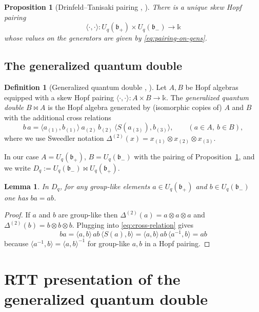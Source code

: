 \documentclass[11pt]{article}
\newcommand{\Bbbk}{\mathbb{k}}
\newcommand{\Uc}{U}
\newcommand{\fb}{\mathfrak{b}}
\newcommand{\la}{\langle}
\newcommand{\ra}{\rangle}
\newcommand{\bipr}{\bowtie}
\theoremstyle{plain}
\newtheorem{proposition}[theorem]{Proposition}
\newtheorem{lemma}[theorem]{Lemma}
\theoremstyle{definition}
\newtheorem{definition}[theorem]{Definition}
\begin{document}
\begin{proposition}[Drinfeld--Tanisaki pairing {\cite[\S8.6]{KS}, \cite{Tanisaki}}]\label{prop:DT-pairing}
There is a unique skew Hopf pairing
\[
\la\cdot,\cdot\ra:\Uc_q(\fb_+)\times \Uc_q(\fb_-)\to \Bbbk
\]
whose values on the generators are given by \eqref{eq:pairing-on-gens}.
\end{proposition}

\subsection{The generalized quantum double}

\begin{definition}[Generalized quantum double {\cite[\S3.2]{KS}, \cite{Majid}}]\label{def:double}
Let $A,B$ be Hopf algebras equipped with a skew Hopf pairing $\la\cdot,\cdot\ra:A\times B\to\Bbbk$.
The \emph{generalized quantum double} $B\bipr A$ is the Hopf algebra generated by (isomorphic copies of) $A$ and $B$ with the additional cross relations
\begin{equation}\label{eq:cross-relation}
b\,a
=
\la a_{(1)},b_{(1)}\ra\ a_{(2)}\,b_{(2)}\ \la S(a_{(3)}),b_{(3)}\ra,
\qquad (a\in A,\ b\in B),
\end{equation}
where we use Sweedler notation $\Delta^{(2)}(x)=x_{(1)}\otimes x_{(2)}\otimes x_{(3)}$.
\end{definition}

In our case $A=\Uc_q(\fb_+)$, $B=\Uc_q(\fb_-)$ with the pairing of Proposition~\ref{prop:DT-pairing}, and we write
$D_q:=\Uc_q(\fb_-)\bipr \Uc_q(\fb_+)$.

\begin{lemma}\label{lem:double-group-likes-commute}
In $D_q$, for any group-like elements $a\in \Uc_q(\fb_+)$ and $b\in \Uc_q(\fb_-)$ one has $ba=ab$.
\end{lemma}

\begin{proof}
If $a$ and $b$ are group-like then $\Delta^{(2)}(a)=a\otimes a\otimes a$ and $\Delta^{(2)}(b)=b\otimes b\otimes b$.
Plugging into \eqref{eq:cross-relation} gives
\[
ba = \la a,b\ra\, a b\, \la S(a),b\ra=\la a,b\ra\,ab\,\la a^{-1},b\ra=ab
\]
because $\la a^{-1},b\ra=\la a,b\ra^{-1}$ for group-like $a,b$ in a Hopf pairing.
\end{proof}

\section{RTT presentation of the generalized quantum double}
\label{sec:RTT}
\end{document}
